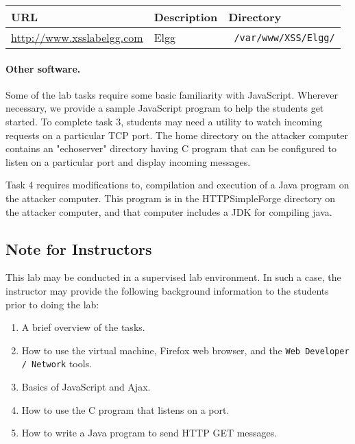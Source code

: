 \newcommand{\urlorurls}{URL }
\newcommand{\urlisorurlsare}{URL is }





\vspace{0.1in}
\begin{tabular}{|l|l|l|}
\hline
URL & Description & Directory\\
\hline
\url{http://www.xsslabelgg.com} & Elgg & {\tt
/var/www/XSS/Elgg/} \\
\hline
\end{tabular}
\vspace{0.1in}




\paragraph{Other software.}
Some of the lab tasks require some basic familiarity with
JavaScript. Wherever necessary, we provide a sample JavaScript program
to help the students get started. To complete task 3, students may
need a utility to watch incoming requests on a particular TCP port. The
home directory on the attacker computer contains an "echoserver" directory having
C program that can be configured to listen on a particular
port and display incoming messages. 

Task 4 requires modifications to, compilation and execution of a Java program
on the attacker computer.  This program is in the HTTPSimpleForge directory
on the attacker computer, and that computer includes a JDK for compiling java.


\subsection{Note for Instructors} 

This lab may be conducted in a
supervised lab environment. In such a case, the instructor may provide
the following background information to the students prior to doing
the lab:
\begin{enumerate}
  \item A brief overview of the tasks.
  \item How to use the virtual machine, Firefox web browser, and the
    {\tt Web Developer / Network} tools.
  \item Basics of JavaScript and Ajax.
  \item How to use the C program that listens on a port. 
  \item How to write a Java program to send HTTP GET messages. 	
\end{enumerate}

